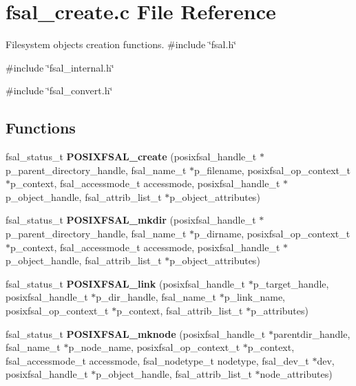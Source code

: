 \section{fsal\_\-create.c File Reference}
\label{fsal__create_8c}


Filesystem objects creation functions.  
{\ttfamily \#include \char`\"{}fsal.h\char`\"{}}\par
{\ttfamily \#include \char`\"{}fsal\_\-internal.h\char`\"{}}\par
{\ttfamily \#include \char`\"{}fsal\_\-convert.h\char`\"{}}\par
\subsection*{Functions}
\begin{DoxyCompactItemize}
\item 
fsal\_\-status\_\-t {\bf POSIXFSAL\_\-create} (posixfsal\_\-handle\_\-t $\ast$p\_\-parent\_\-directory\_\-handle, fsal\_\-name\_\-t $\ast$p\_\-filename, posixfsal\_\-op\_\-context\_\-t $\ast$p\_\-context, fsal\_\-accessmode\_\-t accessmode, posixfsal\_\-handle\_\-t $\ast$p\_\-object\_\-handle, fsal\_\-attrib\_\-list\_\-t $\ast$p\_\-object\_\-attributes)
\item 
fsal\_\-status\_\-t {\bf POSIXFSAL\_\-mkdir} (posixfsal\_\-handle\_\-t $\ast$p\_\-parent\_\-directory\_\-handle, fsal\_\-name\_\-t $\ast$p\_\-dirname, posixfsal\_\-op\_\-context\_\-t $\ast$p\_\-context, fsal\_\-accessmode\_\-t accessmode, posixfsal\_\-handle\_\-t $\ast$p\_\-object\_\-handle, fsal\_\-attrib\_\-list\_\-t $\ast$p\_\-object\_\-attributes)
\item 
fsal\_\-status\_\-t {\bf POSIXFSAL\_\-link} (posixfsal\_\-handle\_\-t $\ast$p\_\-target\_\-handle, posixfsal\_\-handle\_\-t $\ast$p\_\-dir\_\-handle, fsal\_\-name\_\-t $\ast$p\_\-link\_\-name, posixfsal\_\-op\_\-context\_\-t $\ast$p\_\-context, fsal\_\-attrib\_\-list\_\-t $\ast$p\_\-attributes)
\item 
fsal\_\-status\_\-t {\bf POSIXFSAL\_\-mknode} (posixfsal\_\-handle\_\-t $\ast$parentdir\_\-handle, fsal\_\-name\_\-t $\ast$p\_\-node\_\-name, posixfsal\_\-op\_\-context\_\-t $\ast$p\_\-context, fsal\_\-accessmode\_\-t accessmode, fsal\_\-nodetype\_\-t nodetype, fsal\_\-dev\_\-t $\ast$dev, posixfsal\_\-handle\_\-t $\ast$p\_\-object\_\-handle, fsal\_\-attrib\_\-list\_\-t $\ast$node\_\-attributes)
\end{DoxyCompactItemize}



